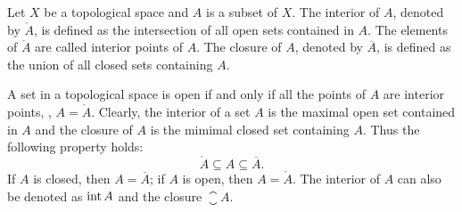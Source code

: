 \begin{defn}
Let $X$ be a topological space and $A$ is a subset of $X$. 
The interior of $A$, denoted by $\mathring{A}$, is defined as the 
intersection of all open sets contained in $A$. 
The elements of $\mathring{A}$ are called interior points of $A$. 
The closure of $A$, denoted by $\overline{A}$, is defined as the union of all 
closed sets containing $A$. 
\end{defn}

A set in a topological space is open if and only if all the points of $A$ 
are interior points, \ie, $A = \mathring{A}$. 
Clearly, the interior of a set $A$ is the maximal open set contained in $A$ 
and the closure of $A$ is the mimimal closed set containing $A$. Thus the 
following property holds: 
\begin{equation*}
    \mathring{A} \subseteq A \subseteq \overline{A}. 
\end{equation*}
If $A$ is closed, then $A = \overline{A}$; if $A$ is open, then 
$A = \mathring{A}$. 
The interior of $A$ can also be denoted as $\operatorname{int} A$ and the closure 
$\closure A$. 


